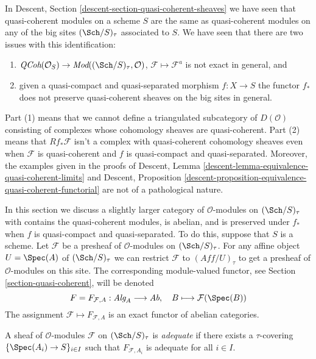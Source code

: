 \noindent
In
Descent, Section \ref{descent-section-quasi-coherent-sheaves}
we have seen that quasi-coherent modules on a scheme $S$
are the same as quasi-coherent modules on any of the big
sites $(\Sch/S)_\tau$ associated to $S$. We have seen that there
are two issues with this identification:
\begin{enumerate}
\item $\textit{QCoh}(\mathcal{O}_S) \to
\textit{Mod}((\Sch/S)_\tau, \mathcal{O})$,
$\mathcal{F} \mapsto \mathcal{F}^a$ is not exact in general, and
\item given a quasi-compact and quasi-separated morphism $f : X \to S$
the functor $f_*$ does not preserve quasi-coherent sheaves on the
big sites in general.
\end{enumerate}
Part (1) means that we cannot define a triangulated subcategory
of $D(\mathcal{O})$ consisting of complexes whose cohomology sheaves
are quasi-coherent. Part (2) means that $Rf_*\mathcal{F}$ isn't a
complex with quasi-coherent cohomology sheaves even when $\mathcal{F}$
is quasi-coherent and $f$ is quasi-compact and quasi-separated.
Moreover, the examples given in the proofs of
Descent, Lemma
\ref{descent-lemma-equivalence-quasi-coherent-limits}
and
Descent, Proposition
\ref{descent-proposition-equivalence-quasi-coherent-functorial}
are not of a pathological nature.

\medskip\noindent
In this section we discuss a slightly larger category
of $\mathcal{O}$-modules on $(\Sch/S)_\tau$ with contains the
quasi-coherent modules, is abelian, and is preserved under $f_*$ when
$f$ is quasi-compact and quasi-separated.
To do this, suppose that $S$ is a scheme. Let $\mathcal{F}$ be a presheaf
of $\mathcal{O}$-modules on $(\Sch/S)_\tau$.
For any affine object $U = \Spec(A)$ of $(\Sch/S)_\tau$
we can restrict $\mathcal{F}$ to $(\textit{Aff}/U)_\tau$ to get
a presheaf of $\mathcal{O}$-modules on this site. The corresponding
module-valued functor, see
Section \ref{section-quasi-coherent},
will be denoted
$$
F = F_{\mathcal{F}, A} :
\textit{Alg}_A \longrightarrow \textit{Ab},
\quad
B \longmapsto \mathcal{F}(\Spec(B))
$$
The assignment $\mathcal{F} \mapsto F_{\mathcal{F}, A}$ is an exact
functor of abelian categories.

\begin{definition}
\label{definition-adequate}
A sheaf of $\mathcal{O}$-modules $\mathcal{F}$ on $(\Sch/S)_\tau$ is
{\it adequate} if there exists a $\tau$-covering
$\{\Spec(A_i) \to S\}_{i \in I}$ such that $F_{\mathcal{F}, A_i}$ is
adequate for all $i \in I$.
\end{definition}

